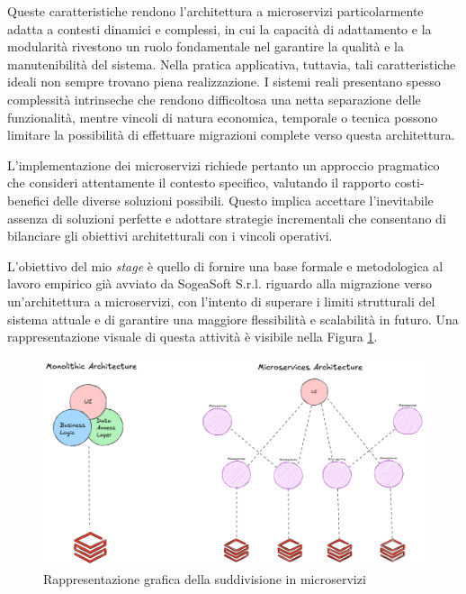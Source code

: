             \vspace{0.2 em}
            \noindent Queste caratteristiche rendono l'architettura a microservizi particolarmente adatta a contesti dinamici e complessi, in cui la capacità di adattamento e la modularità rivestono un ruolo fondamentale nel garantire la qualità e la manutenibilità del sistema. Nella pratica applicativa, tuttavia, tali caratteristiche ideali non sempre trovano piena realizzazione. I sistemi reali presentano spesso complessità intrinseche che rendono difficoltosa una netta separazione delle funzionalità, mentre vincoli di natura economica, temporale o tecnica possono limitare la possibilità di effettuare migrazioni complete verso questa architettura. 

            \noindent L'implementazione dei microservizi richiede pertanto un approccio pragmatico che consideri attentamente il contesto specifico, valutando il rapporto costi-benefici delle diverse soluzioni possibili. Questo implica accettare l'inevitabile assenza di soluzioni perfette e adottare strategie incrementali che consentano di bilanciare gli obiettivi architetturali con i vincoli operativi.

            \vspace{0.2 em}
            \noindent L'obiettivo del mio \textit{stage} è quello di fornire una base formale e metodologica al lavoro empirico già avviato da SogeaSoft S.r.l. riguardo alla migrazione verso un'architettura a microservizi, con l’intento di superare i limiti strutturali del sistema attuale e di garantire una maggiore flessibilità e scalabilità in futuro. Una rappresentazione visuale di questa attività è visibile nella Figura \ref{fig:monolith-vs-microservices}.
            
            \begin{figure}[H]
                \centering
                \includegraphics[width=1.0\linewidth]{BCS-Tessi/images/Monolith-Microservices.png}
                \caption[Rappresentazione grafica della suddivisione in microservizi]{Rappresentazione grafica della suddivisione in microservizi}
                \label{fig:monolith-vs-microservices}
            \end{figure}

